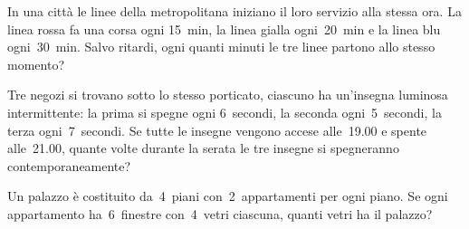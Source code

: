 \begin{multicols}{2}

% 

\begin{esercizio}
In una città le linee della metropolitana iniziano il loro servizio alla 
stessa 
ora. La linea rossa fa una corsa ogni 15~min, la linea gialla ogni~20~min 
e la linea blu ogni~30~min. Salvo ritardi, ogni quanti minuti le tre linee
partono allo stesso momento?
\end{esercizio}

\begin{esercizio}
 Tre negozi si trovano sotto lo stesso porticato, ciascuno ha un'insegna 
luminosa intermittente: la prima si spegne ogni
6~secondi, la seconda ogni~5~secondi, la terza ogni~7~secondi. Se tutte le 
insegne vengono accese alle~19.00 e spente alle~21.00, quante 
volte durante la serata le tre insegne si spegneranno contemporaneamente?
\end{esercizio}


\begin{esercizio}
Un palazzo è costituito da~4~piani con~2~appartamenti per ogni piano. Se ogni 
appartamento ha~6~finestre con~4~vetri
ciascuna, quanti vetri ha il palazzo?
\end{esercizio}


\end{multicols}
